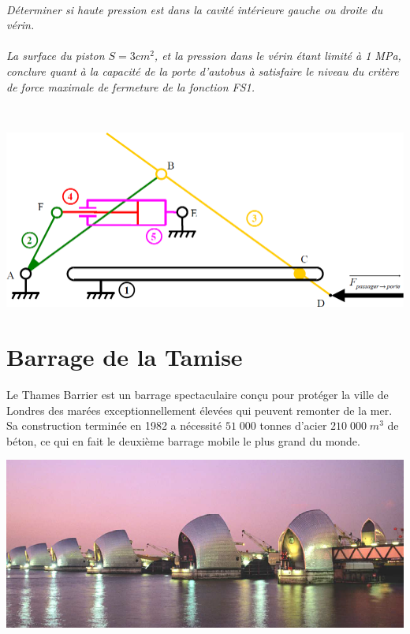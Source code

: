 \documentclass[11pt,oneside]{article}
\begin{document}
\paragraph{}
\textit{Déterminer si haute pression est dans la cavité intérieure gauche ou droite du vérin.}

\paragraph{}
\textit{La surface du piston $S=3cm^2$, et la pression dans le vérin étant limité à 1 MPa, conclure quant à la capacité de la porte d'autobus à satisfaire le niveau du critère de force maximale de fermeture de la fonction FS1.}

\newpage

 $\;$

\vspace{15cm}

\begin{center}
\includegraphics[width=.9\textwidth]{png/img2.png}
\end{center}

\newpage

\section*{Barrage de la Tamise}
\setcounter{paragraph}{0}

Le Thames Barrier est un barrage spectaculaire conçu pour protéger la ville de Londres des marées exceptionnellement élevées qui peuvent remonter de la mer. Sa construction terminée en 1982 a nécessité $51\;000$ tonnes d'acier $210\;000 \; m^3$ de béton, ce qui en fait le deuxième barrage mobile le plus grand du monde. 

\begin{center}
\includegraphics[width=.4\textwidth]{png/img3.png}
\end{center}
\end{document}
